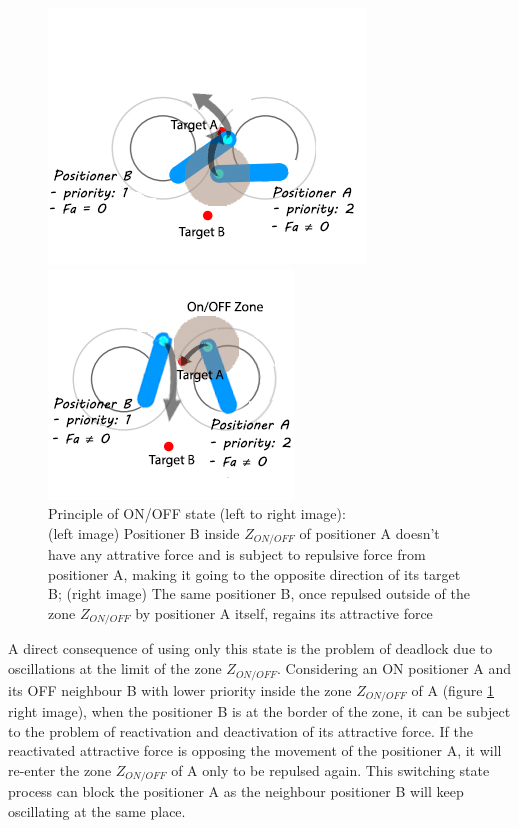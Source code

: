\documentclass[]{spie}  %
\begin{document}
	\begin{figure}[H]
		\centering
		\begin{minipage}[t]{6.5cm}
			\includegraphics[scale=0.54]{images/first_state_0.jpg}
		\end{minipage}
		\begin{minipage}[t]{5cm}
			\includegraphics[scale=0.54]{images/first_state_ONOFF2.jpg}
		\end{minipage}
		\caption{\centering Principle of ON/OFF state (left to right image): \\
			(left image) Positioner B inside  $Z_{ON/OFF}$ of positioner A doesn't have any attrative force and is subject to repulsive force from positioner A, making it going to the opposite direction of its target B; (right image) The same positioner B, once repulsed outside of the zone $Z_{ON/OFF}$  by positioner A itself, regains its attractive force\\
\label{key}			}
		\label{First_state}
	\end{figure}
	
	A direct consequence of using only this state is the problem of deadlock due to oscillations at the limit of the zone $Z_{ON/OFF}$. Considering an ON positioner A and its OFF neighbour B with lower priority inside the zone $Z_{ON/OFF}$ of A (figure \ref{First_state} right image), when the positioner B is at the border of the zone, it can be subject to the problem of reactivation and deactivation of its attractive force. If the reactivated attractive force is opposing the movement of the positioner A, it will re-enter the zone $Z_{ON/OFF}$ of A only to be repulsed again. This switching state process can block the positioner A as the neighbour positioner B will keep oscillating at the same place.\\
	
\end{document}
